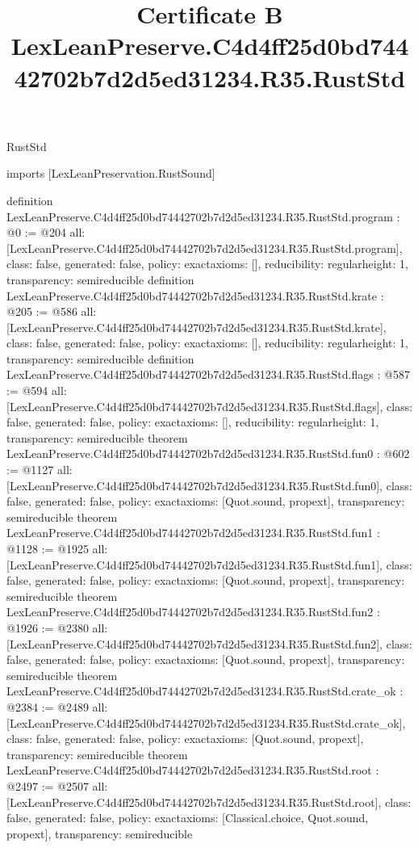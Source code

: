 \begin{lexlean}{RustStd}
\title{Certificate B LexLeanPreserve.C4d4ff25d0bd74442702b7d2d5ed31234.R35.RustStd}
\begin{coremodule}
imports [LexLeanPreservation.RustSound]

definition LexLeanPreserve.C4d4ff25d0bd74442702b7d2d5ed31234.R35.RustStd.program : @0 := @204 {
  all: [LexLeanPreserve.C4d4ff25d0bd74442702b7d2d5ed31234.R35.RustStd.program],
  class: false,
  generated: false,
  policy: exact{axioms: []},
  reducibility: regular{height: 1},
  transparency: semireducible
}
definition LexLeanPreserve.C4d4ff25d0bd74442702b7d2d5ed31234.R35.RustStd.krate : @205 := @586 {
  all: [LexLeanPreserve.C4d4ff25d0bd74442702b7d2d5ed31234.R35.RustStd.krate],
  class: false,
  generated: false,
  policy: exact{axioms: []},
  reducibility: regular{height: 1},
  transparency: semireducible
}
definition LexLeanPreserve.C4d4ff25d0bd74442702b7d2d5ed31234.R35.RustStd.flags : @587 := @594 {
  all: [LexLeanPreserve.C4d4ff25d0bd74442702b7d2d5ed31234.R35.RustStd.flags],
  class: false,
  generated: false,
  policy: exact{axioms: []},
  reducibility: regular{height: 1},
  transparency: semireducible
}
theorem LexLeanPreserve.C4d4ff25d0bd74442702b7d2d5ed31234.R35.RustStd.fun0 : @602 := @1127 {
  all: [LexLeanPreserve.C4d4ff25d0bd74442702b7d2d5ed31234.R35.RustStd.fun0],
  class: false,
  generated: false,
  policy: exact{axioms: [Quot.sound, propext]},
  transparency: semireducible
}
theorem LexLeanPreserve.C4d4ff25d0bd74442702b7d2d5ed31234.R35.RustStd.fun1 : @1128 := @1925 {
  all: [LexLeanPreserve.C4d4ff25d0bd74442702b7d2d5ed31234.R35.RustStd.fun1],
  class: false,
  generated: false,
  policy: exact{axioms: [Quot.sound, propext]},
  transparency: semireducible
}
theorem LexLeanPreserve.C4d4ff25d0bd74442702b7d2d5ed31234.R35.RustStd.fun2 : @1926 := @2380 {
  all: [LexLeanPreserve.C4d4ff25d0bd74442702b7d2d5ed31234.R35.RustStd.fun2],
  class: false,
  generated: false,
  policy: exact{axioms: [Quot.sound, propext]},
  transparency: semireducible
}
theorem LexLeanPreserve.C4d4ff25d0bd74442702b7d2d5ed31234.R35.RustStd.crate_ok : @2384 := @2489 {
  all: [LexLeanPreserve.C4d4ff25d0bd74442702b7d2d5ed31234.R35.RustStd.crate_ok],
  class: false,
  generated: false,
  policy: exact{axioms: [Quot.sound, propext]},
  transparency: semireducible
}
theorem LexLeanPreserve.C4d4ff25d0bd74442702b7d2d5ed31234.R35.RustStd.root : @2497 := @2507 {
  all: [LexLeanPreserve.C4d4ff25d0bd74442702b7d2d5ed31234.R35.RustStd.root],
  class: false,
  generated: false,
  policy: exact{axioms: [Classical.choice, Quot.sound, propext]},
  transparency: semireducible
}


\end{coremodule}
\end{lexlean}
